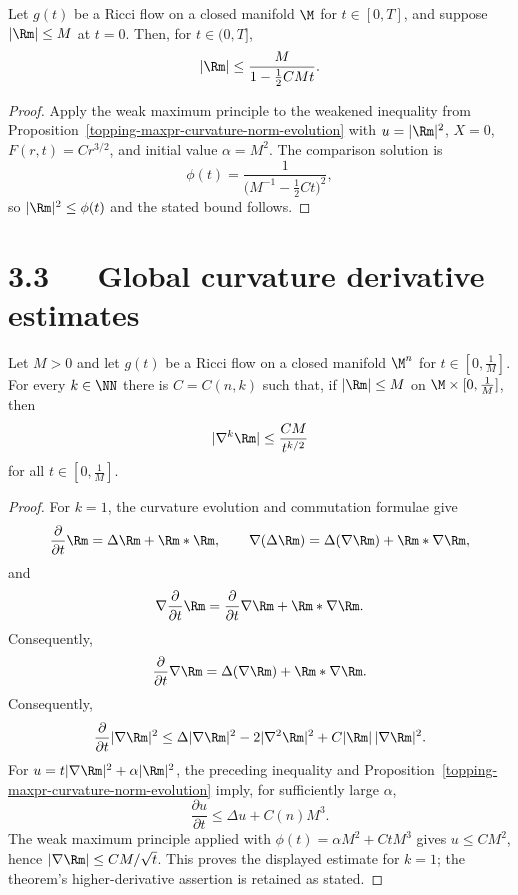 \begin{theorem}
\label{topping-maxpr-curvature-norm-bound}

Let $g(t)$ be a Ricci flow on a closed manifold $\M$ for $t\in[0,T]$, and
suppose $|\Rm|\leq M$ at $t=0$. Then, for $t\in(0,T]$,
\[
|\Rm|\leq\frac{M}{1-\frac12CMt}.
\]
\end{theorem}

\begin{proof}
\sketch Apply the weak maximum principle to the weakened inequality from
Proposition~\ref{topping-maxpr-curvature-norm-evolution} with $u=|\Rm|^2$, $X=0$, $F(r,t)=Cr^{3/2}$, and initial
value $\alpha=M^2$. The comparison solution is
\[
\phi(t)=\frac{1}{\bigl(M^{-1}-\frac12Ct\bigr)^2},
\]
so $|\Rm|^2\leq\phi(t)$ and the stated bound follows.
\end{proof}

\section*{3.3\ \ \ Global curvature derivative estimates}

\begin{theorem}
\label{topping-maxpr-first-derivative-estimate}

Let $M>0$ and let $g(t)$ be a Ricci flow on a closed manifold $\M^n$ for
$t\in[0,\frac1M]$. For every $k\in\NN$ there is $C=C(n,k)$ such that, if
$|\Rm|\leq M$ on $\M\times[0,\frac1M]$, then
\[
|\nabla^k\Rm|\leq\frac{CM}{t^{k/2}}
\]
for all $t\in[0,\frac1M]$.
\end{theorem}

\begin{proof}
\sketch For $k=1$, the curvature evolution and commutation formulae give
\[
\frac{\partial}{\partial t}\Rm=\Delta\Rm+\Rm*\Rm,
\qquad
\nabla(\Delta\Rm)=\Delta(\nabla\Rm)+\Rm*\nabla\Rm,
\]
and
\[
\nabla\frac{\partial}{\partial t}\Rm
=\frac{\partial}{\partial t}\nabla\Rm+\Rm*\nabla\Rm.
\]
Consequently,
\[
\frac{\partial}{\partial t}\nabla\Rm
=\Delta(\nabla\Rm)+\Rm*\nabla\Rm.
\]
Consequently,
\[
\frac{\partial}{\partial t}|\nabla\Rm|^2
\leq\Delta|\nabla\Rm|^2-2|\nabla^2\Rm|^2
 +C|\Rm|\,|\nabla\Rm|^2.
\]
For $u=t|\nabla\Rm|^2+\alpha|\Rm|^2$, the preceding inequality and
Proposition~\ref{topping-maxpr-curvature-norm-evolution} imply, for sufficiently large $\alpha$,
\[
\frac{\partial u}{\partial t}\leq\Delta u+C(n)M^3.
\]
The weak maximum principle applied with
$\phi(t)=\alpha M^2+CtM^3$ gives $u\leq CM^2$, hence
$|\nabla\Rm|\leq CM/\sqrt t$. This proves the displayed estimate for $k=1$;
the theorem's higher-derivative assertion is retained as stated.
\end{proof}

